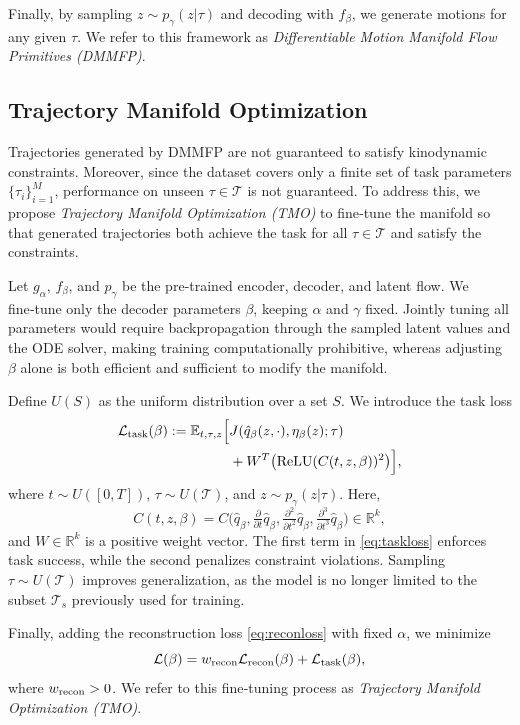 Finally, by sampling $z \sim p_\gamma(z|\tau)$ and decoding with $f_\beta$, we generate motions for any given $\tau$.  
We refer to this framework as \emph{Differentiable Motion Manifold Flow Primitives (DMMFP)}.


\subsection{Trajectory Manifold Optimization}
\label{sec:D}
Trajectories generated by DMMFP are not guaranteed to satisfy kinodynamic constraints.  
Moreover, since the dataset covers only a finite set of task parameters \( \{\tau_i\}_{i=1}^M \), performance on unseen \( \tau \in \mathcal{T} \) is not guaranteed.  
To address this, we propose \emph{Trajectory Manifold Optimization (TMO)} to fine‑tune the manifold so that generated trajectories both achieve the task for all $\tau \in \mathcal{T}$ and satisfy the constraints.

Let $g_\alpha$, $f_\beta$, and $p_\gamma$ be the pre‑trained encoder, decoder, and latent flow.  
We fine‑tune only the decoder parameters $\beta$, keeping $\alpha$ and $\gamma$ fixed.  
Jointly tuning all parameters would require backpropagation through the sampled latent values and the ODE solver, making training computationally prohibitive, whereas adjusting $\beta$ alone is both efficient and sufficient to modify the manifold.

Define $U(S)$ as the uniform distribution over a set $S$.  
We introduce the task loss
\begin{align}
\label{eq:taskloss}
    {\cal L}_{\rm task}(\beta) := \mathbb{E}_{t, \tau, z}\Big[ &J(\hat{q}_\beta(z, \cdot), \eta_\beta(z); \tau) \nonumber \\ &+ W^T \big({\rm ReLU} (C(t, z, \beta))^2\big) \Big],
\end{align}
where $t \sim U([0,T])$, $\tau \sim U(\mathcal{T})$, and $z \sim p_\gamma(z|\tau)$.  
Here,
\begin{equation}
C(t,z,\beta) = C\!\big(\hat q_\beta, \tfrac{\partial}{\partial t}\hat q_\beta, \tfrac{\partial^2}{\partial t^2}\hat q_\beta, \tfrac{\partial^3}{\partial t^3}\hat q_\beta\big) \in \mathbb{R}^k,
\end{equation}
and $W \in \mathbb{R}^k$ is a positive weight vector.  
The first term in \eqref{eq:taskloss} enforces task success, while the second penalizes constraint violations.  
Sampling $\tau \sim U(\mathcal{T})$ improves generalization, as the model is no longer limited to the subset $\mathcal{T}_s$ previously used for training.


Finally, adding the reconstruction loss \eqref{eq:reconloss} with fixed $\alpha$, we minimize
\begin{equation}
{\cal L}(\beta) = w_{\rm recon}{\cal L}_{\rm recon}(\beta) + {\cal L}_{\rm task}(\beta),
\end{equation}
where $w_{\rm recon}>0$.  
We refer to this fine‑tuning process as \emph{Trajectory Manifold Optimization (TMO)}.
